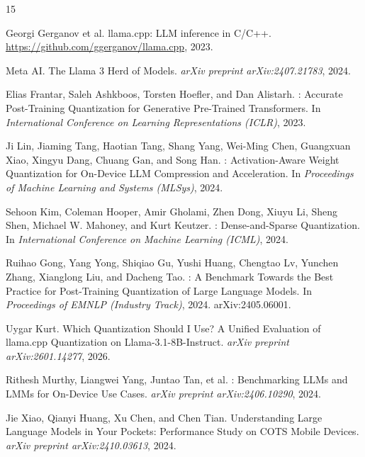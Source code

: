 \documentclass{article}
\begin{document}

\begin{thebibliography}{15}

Georgi Gerganov et al.
\newblock llama.cpp: LLM inference in C/C++.
\newblock \url{https://github.com/ggerganov/llama.cpp}, 2023.

Meta AI.
\newblock The Llama 3 Herd of Models.
\newblock \emph{arXiv preprint arXiv:2407.21783}, 2024.

Elias Frantar, Saleh Ashkboos, Torsten Hoefler, and Dan Alistarh.
: Accurate Post-Training Quantization for Generative Pre-Trained Transformers.
\newblock In \emph{International Conference on Learning Representations (ICLR)}, 2023.

Ji Lin, Jiaming Tang, Haotian Tang, Shang Yang, Wei-Ming Chen, Guangxuan Xiao, Xingyu Dang, Chuang Gan, and Song Han.
: Activation-Aware Weight Quantization for On-Device LLM Compression and Acceleration.
\newblock In \emph{Proceedings of Machine Learning and Systems (MLSys)}, 2024.

Sehoon Kim, Coleman Hooper, Amir Gholami, Zhen Dong, Xiuyu Li, Sheng Shen, Michael W. Mahoney, and Kurt Keutzer.
: Dense-and-Sparse Quantization.
\newblock In \emph{International Conference on Machine Learning (ICML)}, 2024.

Ruihao Gong, Yang Yong, Shiqiao Gu, Yushi Huang, Chengtao Lv, Yunchen Zhang, Xianglong Liu, and Dacheng Tao.
: A Benchmark Towards the Best Practice for Post-Training Quantization of Large Language Models.
\newblock In \emph{Proceedings of EMNLP (Industry Track)}, 2024.
\newblock arXiv:2405.06001.

Uygar Kurt.
\newblock Which Quantization Should I Use? A Unified Evaluation of llama.cpp Quantization on Llama-3.1-8B-Instruct.
\newblock \emph{arXiv preprint arXiv:2601.14277}, 2026.

Rithesh Murthy, Liangwei Yang, Juntao Tan, et al.
: Benchmarking LLMs and LMMs for On-Device Use Cases.
\newblock \emph{arXiv preprint arXiv:2406.10290}, 2024.

Jie Xiao, Qianyi Huang, Xu Chen, and Chen Tian.
\newblock Understanding Large Language Models in Your Pockets: Performance Study on COTS Mobile Devices.
\newblock \emph{arXiv preprint arXiv:2410.03613}, 2024.


\end{thebibliography}
\end{document}
